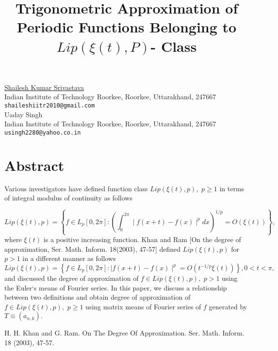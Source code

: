 \documentclass[article,A4,11pt]{llncs}%
\begin{document}
\title{Trigonometric Approximation of Periodic Functions Belonging to $Lip(\xi(t), P)$- Class}
 \author{} \institute{}
\maketitle
\begin{center}
{\large \underline{Shailesh Kumar Srivastava}}\\
Indian Institute of Technology Roorkee, Roorkee, Uttarakhand, 247667\\
{\tt shaileshiitr2010@gmail.com}
\\ \vspace{4mm}
{\large Uaday Singh}\\
Indian Institute of Technology Roorkee, Roorkee, Uttarakhand, 247667\\
{\tt usingh2280@yahoo.co.in}
\end{center}

\section*{Abstract}
Various investigators have defined function class  $Lip(\xi(t), p),$ $p\geq1$ in terms of integral modulus of continuity as follows

\begin{equation}
Lip(\xi(t), p)=\left\{f\in L_{p}[0,2\pi]: \left(\int_{0}^{2\pi}\mid f(x+t)-f(x)\mid^{p}dx \right)^{1/p}= O(\xi(t))\right\},
 \end{equation}
 where $\xi(t)$ is a positive increasing function. Khan and Ram [On the degree of approximation, Ser. Math. Inform. 18(2003), 47-57] defined $Lip(\xi(t), p)$ for $p> 1$ in a different manner as follows
 \begin{equation}
Lip(\xi(t), p)=\left\{f\in L_{p}[0,2\pi]: \mid f(x+t)-f(x)\mid^{p}= O(t^{-1/p}\xi(t))\right\}, 0 < t<\pi ,
 \end{equation}
and discussed the degree of approximation of $f \in Lip(\xi(t), p),$ $p >1$ using the Euler`s means of Fourier series. In this paper, we discuss a relationship between two definitions and obtain degree of approximation of $f \in Lip(\xi(t), p),$ $p\geq 1$ using matrix means of Fourier series of $f$ generated by $T\equiv (a_{n,k}).$


\begin{thebibliography}{10}
{\sc H. H. Khan and G. Ram}. {On The Degree Of Approximation}. Ser. Math. Inform. 18 (2003), 47-57.
\end{thebibliography}
\end{document}
